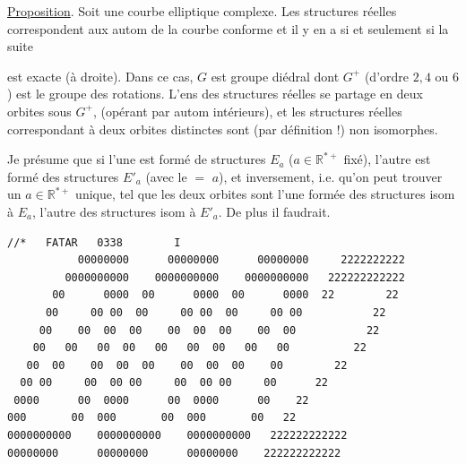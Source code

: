 \uline{Proposition}. Soit une courbe elliptique  complexe.  Les structures réelles    correspondent aux  autom  de la courbe  conforme   et il y en a si et seulement si la suite


est exacte (à droite). Dans ce cas, $G$ est   groupe diédral  dont $G^+$ (d'ordre $2,4$ ou $6$) est le groupe des rotations. L'ens des structures réelles se partage en deux orbites sous $G^+$, (opérant par autom intérieurs), et les structures réelles correspondant à deux orbites distinctes sont (par définition !) non isomorphes. 

Je présume que si l'une est formé de structures $E_a$ ($a\in\mathbb R^{*+}$ fixé), l'autre est formé des structures $E'_a$ (avec le $=$ $a$), et inversement, i.e. qu'on peut trouver un $a\in\mathbb R^{*+}$ unique, tel que les deux orbites sont l'une formée des structures isom à $E_a$, l'autre des structures isom à $E'_a$. De plus il faudrait.


{\scriptsize
\begin{verbatim}
//*   FATAR   0338        I
           00000000      00000000      00000000     2222222222
         0000000000    0000000000    0000000000   222222222222
       00      0000  00      0000  00      0000  22        22
      00     00 00  00     00 00  00     00 00           22
     00    00  00  00    00  00  00    00  00           22
    00   00   00  00   00   00  00   00   00          22
   00  00    00  00  00    00  00  00    00        22
  00 00     00  00 00     00  00 00     00      22
 0000      00  0000      00  0000      00    22
000       00  000       00  000       00   22
0000000000    0000000000    0000000000   222222222222
00000000      00000000      00000000    222222222222
\end{verbatim}
}

